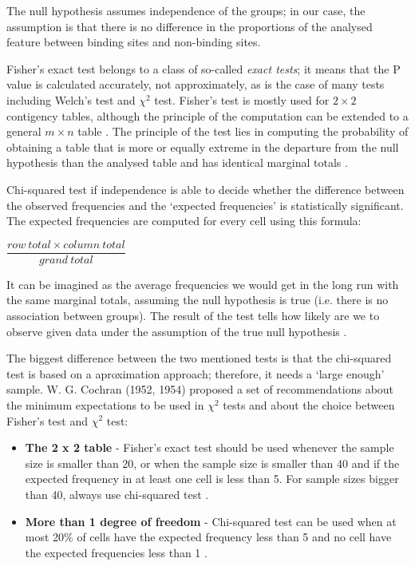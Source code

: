 The null hypothesis assumes independence of the groups; in our case, the assumption is that there is no difference in the proportions of the analysed feature between binding sites and non-binding sites.

Fisher's exact test belongs to a class of so-called \textit{exact tests}; it means that the P value is calculated accurately, not approximately, as is the case of many tests including Welch's test and $\chi^{2}$ test. Fisher's test is mostly used for $2\times 2$ contigency tables, although the principle of the computation can be extended to a general $m\times n$ table \cite{Mehta}. The principle of the test lies in computing the probability of obtaining a table that is more or equally extreme in the departure from the null hypothesis than the analysed table and has identical marginal totals \cite{bland}.

Chi-squared test if independence is able to decide whether the difference between the observed frequencies and the `expected frequencies' is statistically significant. The expected frequencies are computed for every cell using this formula:

\vspace{2mm}
\begin{center}
$\dfrac{row\: total\times column\:total}{grand\:total}$
\end{center}

It can be imagined as the average frequencies we would get in the long run with the same marginal totals, assuming the null hypothesis is true (i.e. there is no association between groups). The result of the test tells how likely are we to observe given data under the assumption of the true null hypothesis \cite{bland}.

The biggest difference between the two mentioned tests is that the chi-squared test is based on a aproximation approach; therefore, it needs a `large enough' sample. W. G. Cochran (1952, 1954) proposed a set of recommendations about the minimum expectations to be used in $\chi^{2}$ tests and about the choice between Fisher's test and $\chi^{2}$ test:

\begin{itemize}
\item \textbf{The 2 x 2 table} - Fisher's exact test should be used whenever the sample size is smaller than 20, or when the sample size is smaller than 40 and if the expected frequency in at least one cell is less than 5. For sample sizes bigger than 40, always use chi-squared test \cite{cochran1952, cochran1954}.
\item \textbf{More than 1 degree of freedom} - Chi-squared test can be used when at most 20\% of cells have the expected frequency less than 5 and no cell have the expected frequencies less than 1 \cite{cochran1954}.
\end{itemize}

